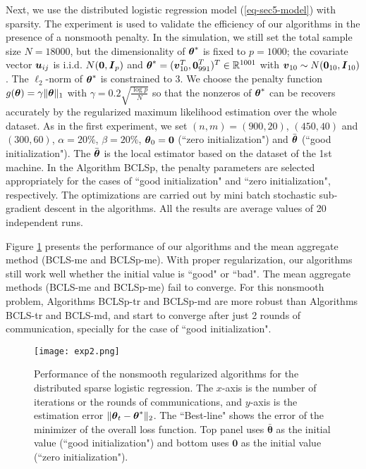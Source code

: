 \documentclass[12pt,a4paper]{article}%
\newcommand \vc[1]{{\mbox{\boldmath${#1}$}}}
\newcommand \vtheta{\vc \theta}
\numberwithin{equation}{section}
\begin{document}
Next, we use the distributed logistic regression model (\ref{eq-sec5-model}) with sparsity. The experiment is used to validate the efficiency of our algorithms in the presence of a nonsmooth penalty. In the simulation, we still set the total sample size $N=18000$, but the dimensionality of $\vtheta^*$ is fixed to $p=1000$; the covariate vector $\vc u_{ij}$ is i.i.d. $N(\vc 0, \vc I_p)$ and  $\vtheta^*=(\vc v_{10}^T,\vc 0_{991}^T)^T\in \mathbb{R}^{1001}$ with $\vc v_{10}\sim N(\vc 0_{10},\vc I_{10})$. The $\ell_2$-norm of $\vtheta^*$ is constrained to 3. We choose the penalty function $g(\vtheta)=\gamma\|\boldsymbol{\theta}\|_1$  with $\gamma=0.2\sqrt{{\frac{\log{p}}{N}}}$ so that the nonzeros of $\vtheta^*$ can be recovers accurately by the regularized maximum likelihood estimation over the whole dataset. As in the first experiment, we set $(n,m)=(900,20)$, $(450,40)$ and $(300,60)$, $\alpha=20\%$, $\beta=20\%$, $\vtheta_0=\vc 0$ (``zero initialization") and $\bar{\vtheta}$ (``good initialization"). The $\bar{\vtheta}$ is the local estimator based on the dataset of the 1st machine. In the Algorithm BCLSp, the penalty parameters are selected appropriately for the cases of ``good initialization" and ``zero initialization", respectively. The optimizations are carried out by mini batch stochastic sub-gradient descent in the algorithms. All the results are average values of 20 independent runs.

Figure \ref{figure2} presents the performance of our algorithms and the mean aggregate method (BCLS-me and BCLSp-me). With proper regularization, our algorithms still work well whether the initial value is ``good" or ``bad". The mean aggregate methods (BCLS-me and BCLSp-me) fail to converge. For this nonsmooth problem, Algorithms BCLSp-tr and BCLSp-md are more robust than Algorithms BCLS-tr and BCLS-md, and start to converge after just 2 rounds of communication, specially for the case of ``good initialization".

\begin{figure}[ht]
\centering
\texttt{[image: exp2.png]}
\caption{Performance of the nonsmooth regularized algorithms for the distributed sparse logistic regression. The $x$-axis is the number of iterations or the rounds of communications, and $y$-axis is the estimation error $\|\vc\theta_t-\vc\theta^*\|_2$. The ``Best-line" shows the error of the minimizer of the overall loss function. Top panel uses $\boldsymbol{\bar{\theta}}$ as the initial value (``good initialization") and bottom uses $\boldsymbol 0$ as the initial value (``zero initialization").}
\label{figure2}
\end{figure}
\end{document}
